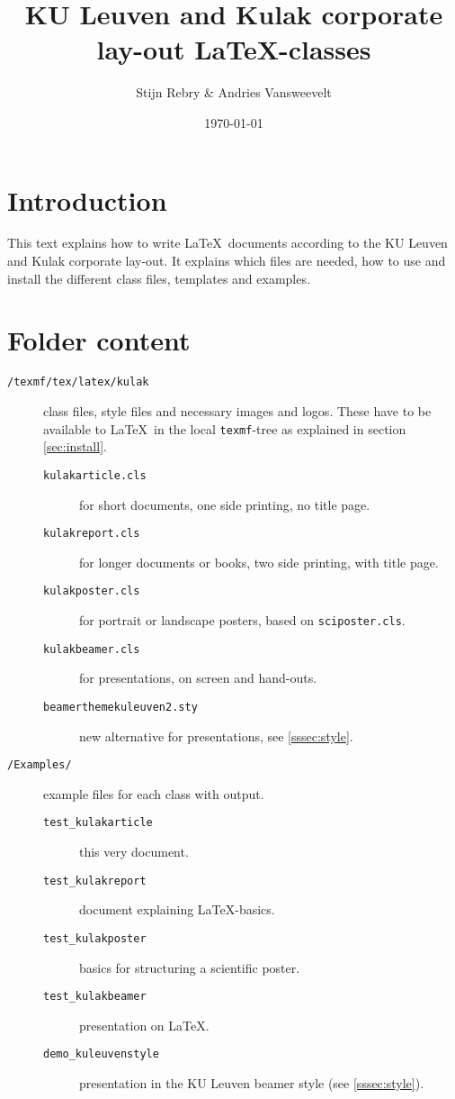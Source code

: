 \documentclass[a4paper,kulak]{kulakarticle} %
\date{\today}
\title{KU Leuven and Kulak corporate lay-out \LaTeX-classes}
\author{Stijn Rebry \& Andries Vansweevelt}
\begin{document}
\maketitle

\section*{Introduction}
This text explains how to write \LaTeX\ documents according to the KU Leuven and Kulak corporate lay-out.
It explains which files are needed, how to use and install the different class files, templates and examples.

\section{Folder content}
\begin{description}
\item[\texttt{/texmf/tex/latex/kulak}] class files, style files and necessary images and logos. These have to be available to \LaTeX\ in the local \texttt{texmf}-tree as explained in section \ref{sec:install}.
\begin{description}
\item[\texttt{kulakarticle.cls}]  for short documents, one side printing, no title page.
\item[\texttt{kulakreport.cls}]  for longer documents or books, two side printing, with title page.
\item[\texttt{kulakposter.cls}]  for portrait or landscape posters, based on \texttt{sciposter.cls}.
\item[\texttt{kulakbeamer.cls}]  for presentations, on screen and hand-outs.
\item[\texttt{beamerthemekuleuven2.sty}]  new alternative for presentations, see \ref{sssec:style}.
\end{description}
\item[\texttt{/Examples/}] example files for each class with output. 
\begin{description}
\item[\texttt{test\_kulakarticle}]  this very document.
\item[\texttt{test\_kulakreport}]  document explaining \LaTeX-basics.
\item[\texttt{test\_kulakposter}]  basics for structuring a scientific poster.
\item[\texttt{test\_kulakbeamer}]  presentation on \LaTeX.
\item[\texttt{demo\_kuleuvenstyle}]  presentation in the KU Leuven beamer style (see \ref{sssec:style}).

\end{description}
\end{description}
\end{document}
